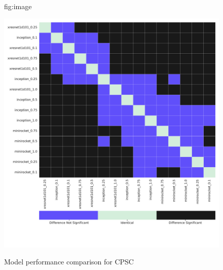 \documentclass[pmlr,twocolumn]{jmlr}%
\begin{document}
\begin{figure}[tbp]
\floatconts
  {fig:image}
  {\caption{Model performance comparison for CPSC}}
  {\includegraphics[width=1\linewidth]{images/model_comparisons_CPSC2018.pdf}}
 
\end{figure}
\end{document}
